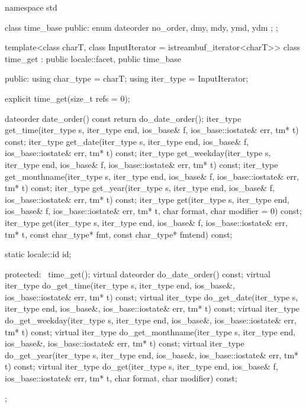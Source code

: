 %
\begin{codeblock}
namespace std {
  class time_base {
  public:
    enum dateorder { no_order, dmy, mdy, ymd, ydm };
  };

  template<class charT, class InputIterator = istreambuf_iterator<charT>>
    class time_get : public locale::facet, public time_base {
    public:
      using char_type = charT;
      using iter_type = InputIterator;

      explicit time_get(size_t refs = 0);

      dateorder date_order() const { return do_date_order(); }
      iter_type get_time(iter_type s, iter_type end, ios_base& f,
                         ios_base::iostate& err, tm* t) const;
      iter_type get_date(iter_type s, iter_type end, ios_base& f,
                         ios_base::iostate& err, tm* t) const;
      iter_type get_weekday(iter_type s, iter_type end, ios_base& f,
                            ios_base::iostate& err, tm* t) const;
      iter_type get_monthname(iter_type s, iter_type end, ios_base& f,
                              ios_base::iostate& err, tm* t) const;
      iter_type get_year(iter_type s, iter_type end, ios_base& f,
                         ios_base::iostate& err, tm* t) const;
      iter_type get(iter_type s, iter_type end, ios_base& f,
                    ios_base::iostate& err, tm* t, char format, char modifier = 0) const;
      iter_type get(iter_type s, iter_type end, ios_base& f,
                    ios_base::iostate& err, tm* t, const char_type* fmt,
                    const char_type* fmtend) const;

      static locale::id id;

    protected:
      ~time_get();
      virtual dateorder do_date_order() const;
      virtual iter_type do_get_time(iter_type s, iter_type end, ios_base&,
                                    ios_base::iostate& err, tm* t) const;
      virtual iter_type do_get_date(iter_type s, iter_type end, ios_base&,
                                    ios_base::iostate& err, tm* t) const;
      virtual iter_type do_get_weekday(iter_type s, iter_type end, ios_base&,
                                       ios_base::iostate& err, tm* t) const;
      virtual iter_type do_get_monthname(iter_type s, iter_type end, ios_base&,
                                         ios_base::iostate& err, tm* t) const;
      virtual iter_type do_get_year(iter_type s, iter_type end, ios_base&,
                                    ios_base::iostate& err, tm* t) const;
      virtual iter_type do_get(iter_type s, iter_type end, ios_base& f,
                               ios_base::iostate& err, tm* t, char format, char modifier) const;
    };
}
\end{codeblock}

